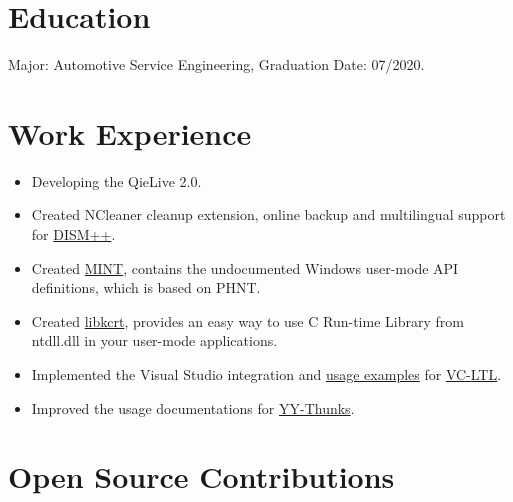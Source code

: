 \documentclass{resume}
\begin{document}
\renewcommand\headrulewidth{0pt}



\section{Education}

  Major: Automotive Service Engineering, Graduation Date: 07/2020.

\section{Work Experience}

\begin{itemize}
  \item Developing the QieLive 2.0.
\end{itemize}

\begin{itemize}
  \item Created NCleaner cleanup extension, online backup and multilingual support for \href{http://www.chuyu.me/zh-Hans/index.html}{DISM++}.
  \item Created \href{https://github.com/Chuyu-Team/MINT}{MINT}, contains the undocumented Windows user-mode API definitions, which is based on PHNT.
  \item Created \href{https://github.com/Chuyu-Team/libkcrt}{libkcrt}, provides an easy way to use C Run-time Library from ntdll.dll in your user-mode applications.
  \item Implemented the Visual Studio integration and \href{https://github.com/Chuyu-Team/vc-ltl-samples}{usage examples} for \href{https://github.com/Chuyu-Team/VC-LTL}{VC-LTL}.
  \item Improved the usage documentations for \href{https://github.com/Chuyu-Team/YY-Thunks}{YY-Thunks}.
\end{itemize}

\section{Open Source Contributions}
\end{document}
